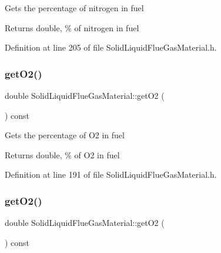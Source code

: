 Gets the percentage of nitrogen in fuel \begin{DoxyReturn}{Returns}
double, \% of nitrogen in fuel 
\end{DoxyReturn}


Definition at line 205 of file Solid\+Liquid\+Flue\+Gas\+Material.\+h.

\mbox{\label{class_solid_liquid_flue_gas_material_a08d588e576f605d3f9925cb649e1105e}} 
\subsubsection{\texorpdfstring{get\+O2()}{getO2()}\hspace{0.1cm}{\footnotesize\ttfamily [1/3]}}
{\footnotesize\ttfamily double Solid\+Liquid\+Flue\+Gas\+Material\+::get\+O2 (\begin{DoxyParamCaption}{ }\end{DoxyParamCaption}) const\hspace{0.3cm}{\ttfamily [inline]}}

Gets the percentage of O2 in fuel \begin{DoxyReturn}{Returns}
double, \% of O2 in fuel 
\end{DoxyReturn}


Definition at line 191 of file Solid\+Liquid\+Flue\+Gas\+Material.\+h.

\mbox{\label{class_solid_liquid_flue_gas_material_a08d588e576f605d3f9925cb649e1105e}} 
\subsubsection{\texorpdfstring{get\+O2()}{getO2()}\hspace{0.1cm}{\footnotesize\ttfamily [2/3]}}
{\footnotesize\ttfamily double Solid\+Liquid\+Flue\+Gas\+Material\+::get\+O2 (\begin{DoxyParamCaption}{ }\end{DoxyParamCaption}) const\hspace{0.3cm}{\ttfamily [inline]}}

